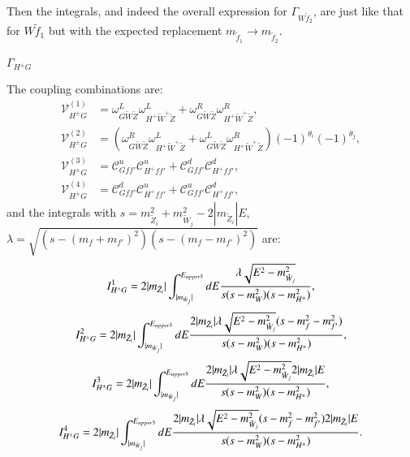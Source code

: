 \documentclass[final,3p,times,pdflatex]{elsarticle}
\begin{document}
Then the integrals, and indeed the overall expression for $\Gamma_{W \tilde{f}_2}$, are just like that for $W \tilde{f}_1$ but with the expected replacement $m_{\tilde{f}_1} \rightarrow m_{\tilde{f}_2}$.

\textbf{\underline{$\Gamma_{H^{\pm} G}$}}

The coupling combinations are:
\begin{align}
\mathcal{V}_{H^{\pm} G}^{(1)} &= \omega_{G \tilde{W} \tilde{Z}}^L  \omega_{H^+ \tilde{W}^+ \tilde{Z}}^L + \omega_{G \tilde{W} \tilde{Z}}^R  \omega_{H^+ \tilde{W}^+ \tilde{Z}}^R, \\
\mathcal{V}_{H^{\pm} G}^{(2)} &= (\omega_{G \tilde{W} \tilde{Z}}^R  \omega_{H^+ \tilde{W}^+ \tilde{Z}}^L + \omega_{G \tilde{W} \tilde{Z}}^L  \omega_{H^+ \tilde{W}^+ \tilde{Z}}^R)(-1)^{\theta_i}(-1)^{\theta_j}, \\
\mathcal{V}_{H^{\pm} G}^{(3)} &= \mathcal{C}_{G f f'}^u  \mathcal{C}_{H^+ f f'}^u + \mathcal{C}_{G f f'}^d  \mathcal{C}_{H^+ f f'}^d, \\
\mathcal{V}_{H^{\pm} G}^{(4)} &= \mathcal{C}_{G f f'}^d  \mathcal{C}_{H^+ f f'}^u + \mathcal{C}_{G f f'}^u  \mathcal{C}_{H^+ f f'}^d,
\end{align}
and the integrals with $s = m_{\tilde{Z}_i}^2 + m_{\tilde{W}_j}^2 - 2|m_{\tilde{Z}_i}|E$, $\lambda = \sqrt{(s-(m_{f}+m_{f'})^2)(s-(m_{f}-m_{f'})^2)}$ are:
\begin{equation}
I_{H^{\pm} G}^{1} = 2|m_{\tilde{Z}_i}| \int_{|m_{\tilde{W}_j}|}^{E_{upper3}} dE  {\lambda \sqrt{E^2 - m_{\tilde{W}_j}^2}   \over s(s-m_{W}^2)(s-m_{H^{\pm}}^2)},
\end{equation}
\begin{equation}
I_{H^{\pm} G}^{2} = 2|m_{\tilde{Z}_i}| \int_{|m_{\tilde{W}_j}|}^{E_{upper3}} dE {2|m_{\tilde{Z}_i}| \lambda \sqrt{E^2-m_{\tilde{W}_j}^2} (s- m_{f}^2 - m_{f'}^2) \over s(s-m_{W}^2)(s-m_{H^{\pm}}^2)},
\end{equation}
\begin{equation}
I_{H^{\pm} G}^{3} = 2|m_{\tilde{Z}_i}| \int_{|m_{\tilde{W}_j}|}^{E_{upper3}} dE {2|m_{\tilde{Z}_i}| \lambda \sqrt{E^2-m_{\tilde{W}_j}^2} 2|m_{\tilde{Z}_i}|E \over s(s-m_{W}^2)(s-m_{H^{\pm}}^2)},
\end{equation}
\begin{equation}
I_{H^{\pm} G}^{4} = 2|m_{\tilde{Z}_i}| \int_{|m_{\tilde{W}_j}|}^{E_{upper3}} dE {2|m_{\tilde{Z}_i}| \lambda \sqrt{E^2-m_{\tilde{W}_j}^2} (s- m_{f}^2 - m_{f'}^2) 2|m_{\tilde{Z}_i}|E \over s(s-m_{W}^2)(s-m_{H^{\pm}}^2)}.
\end{equation}
\end{document}
